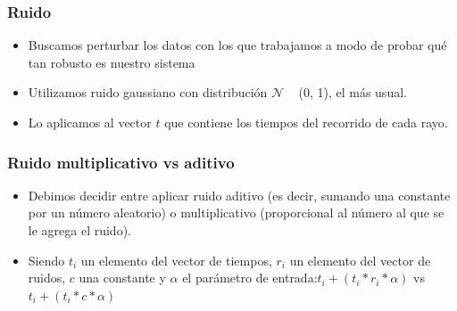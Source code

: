 \documentclass[11pt]{beamer}
\begin{document}
\begin{frame}
\frametitle{Ruido}

\begin{itemize}
\item Buscamos perturbar los datos con los que trabajamos a modo de probar qué tan robusto es nuestro sistema

\item Utilizamos ruido gaussiano con distribución $\mathcal{N}$ ~ (0, 1), el más usual. 

\item Lo aplicamos al vector $t$ que contiene los tiempos del recorrido de cada rayo.


\end{itemize}

\end{frame}


\begin{frame}
    \frametitle{Ruido multiplicativo vs aditivo}
	\begin{itemize}
	\item Debimos decidir entre aplicar ruido aditivo (es decir, sumando una constante por un número aleatorio) o multiplicativo (proporcional al número al que se le agrega el ruido).

	\item Siendo $t_i$ un elemento del vector de tiempos, $r_i$ un elemento del vector de ruidos, $c$ una constante y $\alpha$ el parámetro de entrada:\newline $t_i + (t_i * r_i * \alpha)$ vs $t_i + (t_i * c * \alpha)$
	
	\end{itemize}

\end{frame}
\end{document}
